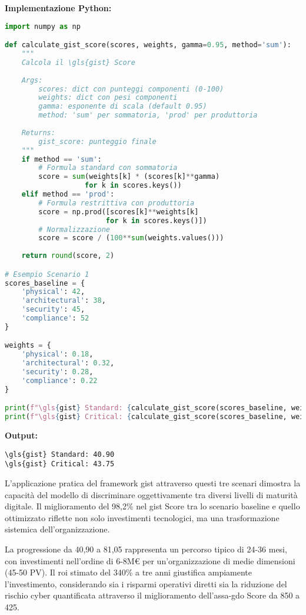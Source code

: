 \begin{tcolorbox}
\vspace{0.3cm}
\textbf{Implementazione Python:}
\begin{lstlisting}[language=Python, basicstyle=\scriptsize\ttfamily]
import numpy as np

def calculate_gist_score(scores, weights, gamma=0.95, method='sum'):
    """
    Calcola il \gls{gist} Score
    
    Args:
        scores: dict con punteggi componenti (0-100)
        weights: dict con pesi componenti
        gamma: esponente di scala (default 0.95)
        method: 'sum' per sommatoria, 'prod' per produttoria
    
    Returns:
        gist_score: punteggio finale
    """
    if method == 'sum':
        # Formula standard con sommatoria
        score = sum(weights[k] * (scores[k]**gamma) 
                   for k in scores.keys())
    elif method == 'prod':
        # Formula restrittiva con produttoria
        score = np.prod([scores[k]**weights[k] 
                        for k in scores.keys()])
        # Normalizzazione
        score = score / (100**sum(weights.values()))
    
    return round(score, 2)

# Esempio Scenario 1
scores_baseline = {
    'physical': 42,
    'architectural': 38,
    'security': 45,
    'compliance': 52
}

weights = {
    'physical': 0.18,
    'architectural': 0.32,
    'security': 0.28,
    'compliance': 0.22
}

print(f"\gls{gist} Standard: {calculate_gist_score(scores_baseline, weights)}")
print(f"\gls{gist} Critical: {calculate_gist_score(scores_baseline, weights, method='prod')}")
\end{lstlisting}

\textbf{Output:}
\begin{verbatim}
\gls{gist} Standard: 40.90
\gls{gist} Critical: 43.75
\end{verbatim}

\end{tcolorbox}

L'applicazione pratica del framework \gls{gist} attraverso questi tre scenari dimostra la capacità del modello di discriminare oggettivamente tra diversi livelli di maturità digitale. Il miglioramento del 98,2\% nel \gls{gist} Score tra lo scenario baseline e quello ottimizzato riflette non solo investimenti tecnologici, ma una trasformazione sistemica dell'organizzazione.

La progressione da 40,90 a 81,05 rappresenta un percorso tipico di 24-36 mesi, con investimenti nell'ordine di 6-8M€ per un'organizzazione di medie dimensioni (45-50 PV). Il \gls{roi} stimato del 340\% a tre anni giustifica ampiamente l'investimento, considerando sia i risparmi operativi diretti sia la riduzione del rischio cyber quantificata attraverso il miglioramento dell'\gls{assa-gdo} Score da 850 a 425.

